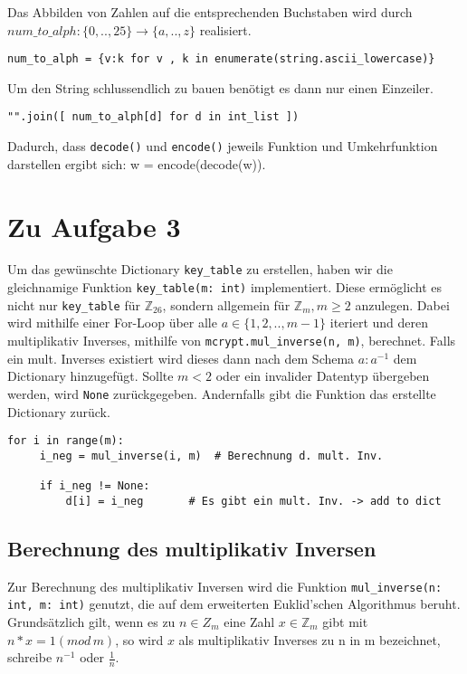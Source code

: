 \documentclass[12pt]{article}
\begin{document}
Das Abbilden von Zahlen auf die entsprechenden Buchstaben wird durch $num\_to\_alph: \{0,..,25\} \to \{a,..,z\}$ realisiert.
\begin{lstlisting}
num_to_alph = {v:k for v , k in enumerate(string.ascii_lowercase)}
\end{lstlisting}

Um den String schlussendlich zu bauen benötigt es dann nur einen Einzeiler.
\begin{lstlisting}
"".join([ num_to_alph[d] for d in int_list ])
\end{lstlisting}

Dadurch, dass \texttt{decode()} und \texttt{encode()} jeweils Funktion und Umkehrfunktion darstellen ergibt sich: w = encode(decode(w)).


\section{Zu Aufgabe 3}
Um das gewünschte Dictionary \texttt{key\_table} zu erstellen, haben wir die gleichnamige Funktion \texttt{key\_table(m: int)} implementiert. Diese ermöglicht es nicht nur \texttt{key\_table} für $\mathbb{Z}_{26}$, sondern allgemein für $\mathbb{Z}_{m},  m \geq 2$ anzulegen. Dabei wird mithilfe einer For-Loop über alle $ a \in \{1,2,..,m-1\}$ iteriert und deren multiplikativ Inverses, mithilfe von \texttt{mcrypt.mul\_inverse(n, m)}, berechnet. Falls ein mult. Inverses existiert wird dieses dann nach dem Schema \texttt{$a:a^{-1}$} dem Dictionary hinzugefügt. Sollte $m < 2$ oder ein invalider Datentyp übergeben werden, wird \texttt{None} zurückgegeben. Andernfalls gibt die Funktion das erstellte Dictionary zurück. 
\begin{lstlisting}
for i in range(m):
     i_neg = mul_inverse(i, m)	# Berechnung d. mult. Inv.
 	
     if i_neg != None:
         d[i] = i_neg		# Es gibt ein mult. Inv. -> add to dict
\end{lstlisting}

\subsection{Berechnung des multiplikativ Inversen}
Zur Berechnung des multiplikativ Inversen wird die Funktion \texttt{mul\_inverse(n: int, m: int)} genutzt, die auf dem erweiterten Euklid'schen Algorithmus beruht. Grundsätzlich gilt, wenn es zu $n \in Z_{m}$ eine Zahl $x \in \mathbb{Z}_{m}$ gibt mit $n * x = 1 (mod \, m)$, so wird $x$ als multiplikativ Inverses zu n in m bezeichnet, schreibe $n^{-1}$ oder $\frac{1}{n}$.
\end{document}
